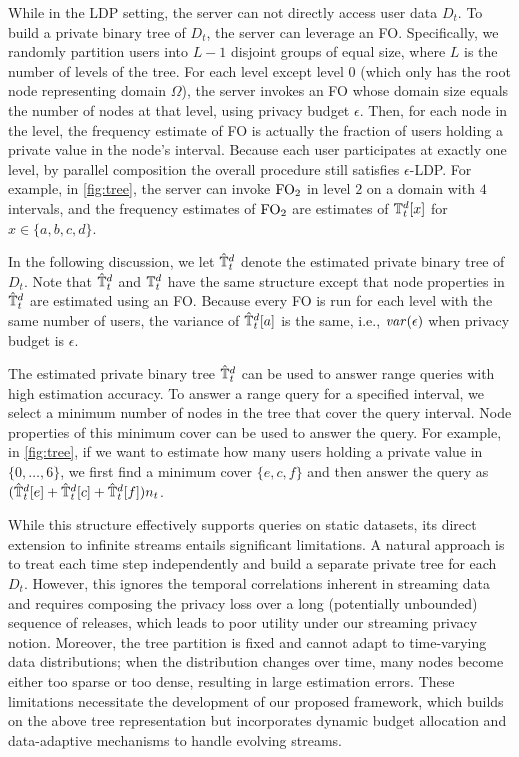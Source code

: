 While in the LDP setting, the server can not directly access user data $D_t$.
To build a private binary tree of $D_t$, the server can leverage an FO.
Specifically, we randomly partition users into $L-1$ disjoint groups of equal
size, where $L$ is the number of levels of the tree.
For each level except level $0$ (which only has the root node representing
domain $\Omega$), the server invokes an FO whose domain size equals the number
of nodes at that level, using privacy budget $\epsilon$.
Then, for each node in the level, the frequency estimate of FO is actually the
fraction of users holding a private value in the node's interval.
Because each user participates at exactly one level, by parallel composition the
overall procedure still satisfies $\epsilon$-LDP.
For example, in \cref{fig:tree}, the server can invoke $\text{FO}_2$ in level $2$ on a
domain with $4$ intervals, and the frequency estimates of $\text{FO}_2$ are estimates
of $\mathbb{T}^d_t[x]$ for $x\in\{a,b,c,d\}$.

In the following discussion, we let $\hat{\mathbb{T}}^d_t$ denote the estimated private binary
tree of $D_t$.
Note that $\hat{\mathbb{T}}^d_t$ and $\mathbb{T}^d_t$ have the same structure except that node
properties in $\hat{\mathbb{T}}^d_t$ are estimated using an FO.
Because every FO is run for each level with the same number of users, the
variance of $\hat{\mathbb{T}}^d_t[a]$ is the same, i.e., $\mathit{var}(\epsilon)$ when privacy budget
is $\epsilon$.

The estimated private binary tree $\hat{\mathbb{T}}^d_t$ can be used to answer range queries
with high estimation accuracy.
To answer a range query for a specified interval, we select a minimum number of
nodes in the tree that cover the query interval.
Node properties of this minimum cover can be used to answer the query.
For example, in \cref{fig:tree}, if we want to estimate how many users holding a
private value in $\{0,\ldots,6\}$, we first find a minimum cover $\{e,c,f\}$ and
then answer the query as $(\hat{\mathbb{T}}^d_t[e]+\hat{\mathbb{T}}^d_t[c]+\hat{\mathbb{T}}^d_t[f])n_t$.

While this structure effectively supports queries on static datasets, its direct extension to infinite streams entails significant limitations. A natural approach is to treat each time step independently and build a separate private tree for each $D_t$. However, this ignores the temporal correlations inherent in streaming data and requires composing the privacy loss over a long (potentially unbounded) sequence of releases, which leads to poor utility under our streaming privacy notion. Moreover, the tree partition is fixed and cannot adapt to time-varying data distributions; when the distribution changes over time, many nodes become either too sparse or too dense, resulting in large estimation errors. These limitations necessitate the development of our proposed framework, which builds on the above tree representation but incorporates dynamic budget allocation and data-adaptive mechanisms to handle evolving streams.

